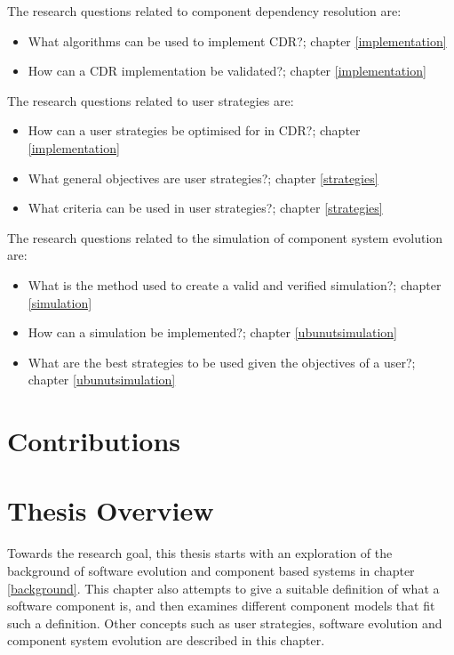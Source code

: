 The research questions related to component dependency resolution are:
\begin{itemize}
  \item What algorithms can be used to implement CDR?; chapter \ref{implementation}
  \item How can a CDR implementation be validated?; chapter \ref{implementation}
\end{itemize}

The research questions related to user strategies are: 
\begin{itemize}
	\item How can a user strategies be optimised for in CDR?; chapter \ref{implementation}
	\item What general objectives are user strategies?;  chapter \ref{strategies}
	\item What criteria can be used in user strategies?; chapter \ref{strategies}
\end{itemize}

The research questions related to the simulation of component system evolution are: 
\begin{itemize}
	\item What is the method used to create a valid and verified simulation?;  chapter \ref{simulation}
	\item How can a simulation be implemented?;  chapter \ref{ubunutsimulation}
	\item What are the best strategies to be used given the objectives of a user?;  chapter \ref{ubunutsimulation}
\end{itemize}

\section{Contributions}

\section{Thesis Overview}
Towards the research goal, this thesis starts with an exploration of the background of software evolution and component based systems in chapter \ref{background}.
This chapter also attempts to give a suitable definition of what a software component is, and then examines different component models that fit such a definition.
Other concepts such as user strategies, software evolution and component system evolution are described in this chapter.

